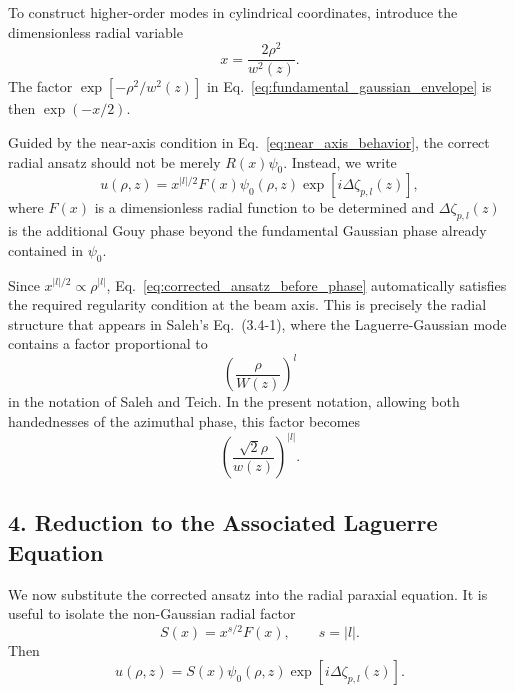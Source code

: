 \begin{resolucao}[Solution]
    To construct higher-order modes in cylindrical coordinates, introduce the dimensionless radial variable
    \begin{equation}
        x
        =
        \frac{2\rho^2}{w^2(z)}.
        \label{eq:x_definition}
    \end{equation}
    The factor $\exp[-\rho^2/w^2(z)]$ in Eq.~\eqref{eq:fundamental_gaussian_envelope} is then $\exp(-x/2)$.

    Guided by the near-axis condition in Eq.~\eqref{eq:near_axis_behavior}, the correct radial ansatz should not be merely $R(x)\psi_0$. Instead, we write
    \begin{equation}
        u(\rho,z)
        =
        x^{|l|/2}
        F(x)
        \psi_0(\rho,z)
        \exp\left[
            i\Delta\zeta_{p,l}(z)
        \right],
        \label{eq:corrected_ansatz_before_phase}
    \end{equation}
    where $F(x)$ is a dimensionless radial function to be determined and $\Delta\zeta_{p,l}(z)$ is the additional Gouy phase beyond the fundamental Gaussian phase already contained in $\psi_0$.

    Since $x^{|l|/2}\propto \rho^{|l|}$, Eq.~\eqref{eq:corrected_ansatz_before_phase} automatically satisfies the required regularity condition at the beam axis. This is precisely the radial structure that appears in Saleh's Eq.~(3.4-1), where the Laguerre-Gaussian mode contains a factor proportional to
    \[
        \left(
            \frac{\rho}{W(z)}
        \right)^l
    \]
    in the notation of Saleh and Teich. In the present notation, allowing both handednesses of the azimuthal phase, this factor becomes
    \[
        \left(
            \frac{\sqrt{2}\rho}{w(z)}
        \right)^{|l|}.
    \]

\subsection*{4. Reduction to the Associated Laguerre Equation}

    We now substitute the corrected ansatz into the radial paraxial equation. It is useful to isolate the non-Gaussian radial factor
    \begin{equation}
        S(x)
        =
        x^{s/2}F(x),
        \qquad
        s=|l|.
        \label{eq:S_definition}
    \end{equation}
    Then
    \begin{equation}
        u(\rho,z)
        =
        S(x)\psi_0(\rho,z)
        \exp[
            i\Delta\zeta_{p,l}(z)
        ].
        \label{eq:u_with_S}
    \end{equation}


\end{resolucao}
